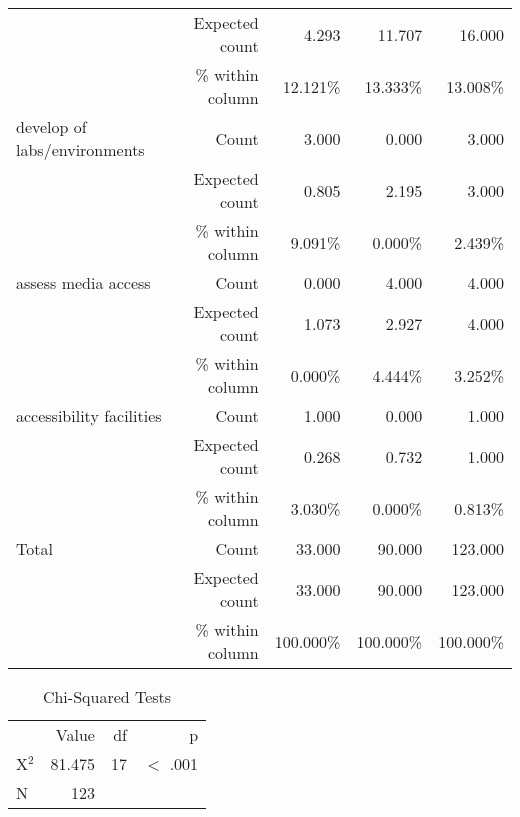 \documentclass[6pt, oneside]{article}   	%
\begin{document}
\begin{table}[h]
{\begin{tabular}{lrrrr}
			 & Expected count & 4.293 & 11.707 & 16.000  \\
			 &  \% within column & 12.121\% & 13.333\% & 13.008\%  \\
			develop of labs/environments & Count & 3.000 & 0.000 & 3.000  \\
			 & Expected count & 0.805 & 2.195 & 3.000  \\
			 &  \% within column & 9.091\% & 0.000\% & 2.439\%  \\
			assess media access & Count & 0.000 & 4.000 & 4.000  \\
			 & Expected count & 1.073 & 2.927 & 4.000  \\
			 &  \% within column & 0.000\% & 4.444\% & 3.252\%  \\
			accessibility facilities & Count & 1.000 & 0.000 & 1.000  \\
			 & Expected count & 0.268 & 0.732 & 1.000  \\
			 &  \% within column & 3.030\% & 0.000\% & 0.813\%  \\
			Total & Count & 33.000 & 90.000 & 123.000  \\
			 & Expected count & 33.000 & 90.000 & 123.000  \\
			 &  \% within column & 100.000\% & 100.000\% & 100.000\%  \\
			\bottomrule
		\end{tabular}
	}
\end{table}


\begin{table}[h]
	\centering
	\caption{Chi-Squared Tests}
	\label{tab:chi-SquaredTests}
	{
		\begin{tabular}{lrrr}
			\toprule
			 & Value & df & p  \\
			\cmidrule[0.4pt]{1-4}
			X$^{2}$ & 81.475 & 17 & $<$ .001  \\
			N & 123 &  &    \\
			\bottomrule
		\end{tabular}
	}
\end{table}
\end{document}
